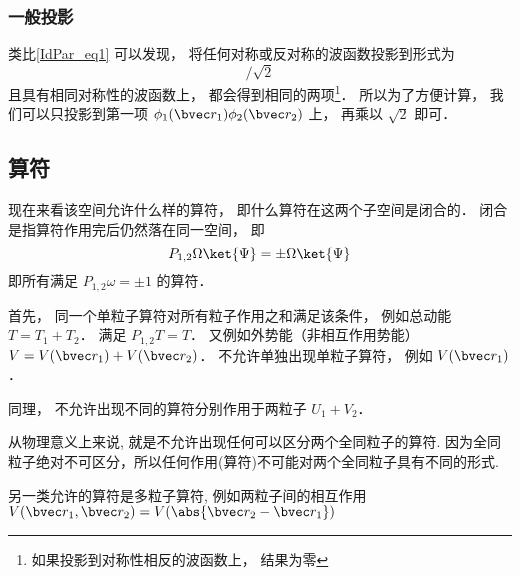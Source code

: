\subsubsection{一般投影}
类比\autoref{IdPar_eq1} 可以发现， 将任何对称或反对称的波函数投影到形式为
\begin{equation}
[\phi_1(\bvec r_1)\phi_2(\bvec r_2) \pm \phi_2(\bvec r_1)\phi_1(\bvec r_2)]/\sqrt{2}
\end{equation}
且具有相同对称性的波函数上， 都会得到相同的两项\footnote{如果投影到对称性相反的波函数上， 结果为零}． 所以为了方便计算， 我们可以只投影到第一项 $\phi_1(\bvec r_1)\phi_2(\bvec r_2)$ 上， 再乘以 $\sqrt{2}$ 即可．

\subsection{算符}
现在来看该空间允许什么样的算符， 即什么算符在这两个子空间是闭合的． 闭合是指算符作用完后仍然落在同一空间， 即
\begin{equation}
P_{1,2}\Omega\ket{\Psi} = \pm \Omega \ket{\Psi}
\end{equation}
即所有满足 $P_{1,2}\omega = \pm 1$ 的算符．

首先， 同一个单粒子算符对所有粒子作用之和满足该条件， 例如总动能 $T = T_1 + T_2$． 满足 $P_{1,2}T = T$． 又例如外势能（非相互作用势能） $V = V(\bvec r_1) + V(\bvec r_2)$． 不允许单独出现单粒子算符， 例如 $V(\bvec r_1)$．

同理， 不允许出现不同的算符分别作用于两粒子 $U_1 + V_2$．

从物理意义上来说, 就是不允许出现任何可以区分两个全同粒子的算符. 因为全同粒子绝对不可区分，所以任何作用(算符)不可能对两个全同粒子具有不同的形式.

另一类允许的算符是多粒子算符, 例如两粒子间的相互作用 $V(\bvec r_1, \bvec r_2) = V(\abs{\bvec r_2 - \bvec r_1})$
